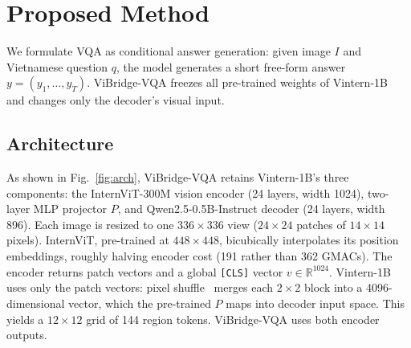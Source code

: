 \section{Proposed Method}
\label{sec:method}

We formulate VQA as conditional answer generation: given image $I$ and Vietnamese question $q$,
the model generates a short free-form answer $y=(y_1,\dots,y_T)$. ViBridge-VQA freezes all
pre-trained weights of Vintern-1B~\cite{doan2024vintern1b} and changes only the decoder's visual
input.

\subsection{Architecture}
\label{sec:encoding}

As shown in Fig.~\ref{fig:arch}, ViBridge-VQA retains Vintern-1B's three components: the
InternViT-300M vision encoder (24 layers, width 1024), two-layer MLP projector $P$, and
Qwen2.5-0.5B-Instruct decoder (24 layers, width 896). Each image is resized to one
$336\times336$ view ($24\times24$ patches of $14\times14$ pixels). InternViT, pre-trained at
$448\times448$, bicubically interpolates its position embeddings, roughly halving encoder cost
(191 rather than 362 GMACs). The encoder returns patch vectors and a global \texttt{[CLS]} vector
$v\in\mathbb{R}^{1024}$. Vintern-1B uses only the patch vectors: pixel
shuffle~\cite{chen2024internvl15} merges each $2\times2$ block into a 4096-dimensional vector,
which the pre-trained $P$ maps into decoder input space. This yields a $12\times12$ grid of 144
region tokens. ViBridge-VQA uses both encoder outputs.

